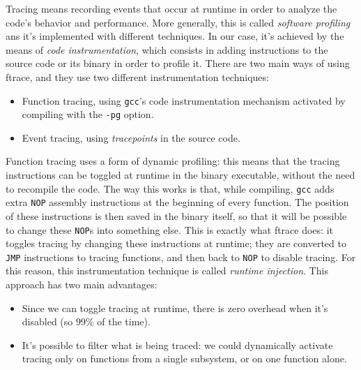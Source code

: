 Tracing means recording events that occur at runtime in order to analyze the code's behavior and performance. More generally, this is called \textit{software profiling} ans it's implemented with different techniques. In our case, it's achieved by the means of \textit{code instrumentation}, which consists in adding instructions to the source code or its binary in order to profile it. There are two main ways of using ftrace, and they use two different instrumentation techniques:
\begin{itemize}
    \item Function tracing, using \verb|gcc|'s code instrumentation mechanism activated by compiling with the \verb|-pg| option.
    \item Event tracing, using \textit{tracepoints} in the source code.
\end{itemize}
Function tracing uses a form of dynamic profiling: this means that the tracing instructions can be toggled at runtime in the binary executable, without the need to recompile the code. The way this works is that, while compiling, \verb|gcc| adds extra \verb|NOP| assembly instructions at the beginning of every function. The position of these instructions is then saved in the binary itself, so that it will be possible to change these \verb|NOP|s into something else. This is exactly what ftrace does: it toggles tracing by changing these instructions at runtime; they are converted to \verb|JMP| instructions to tracing functions, and then back to \verb|NOP| to disable tracing. For this reason, this instrumentation technique is called \textit{runtime injection}. This approach has two main advantages: 
\begin{itemize}
    \item Since we can toggle tracing at runtime, there is zero overhead when it's disabled (so 99\% of the time).
    \item It's possible to filter what is being traced: we could dynamically activate tracing only on functions from a single subsystem, or on one function alone.
\end{itemize}

